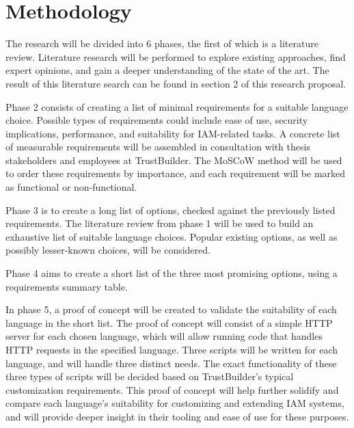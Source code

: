 
\section{Methodology}%
\label{sec:methodology}

The research will be divided into 6 phases, the first of which is a literature review. Literature research will be performed to explore existing approaches, find expert opinions, and gain a deeper understanding of the state of the art. The result of this literature search can be found in section 2 of this research proposal.

Phase 2 consists of creating a list of minimal requirements for a suitable language choice. Possible types of requirements could include ease of use, security implications, performance, and suitability for IAM-related tasks. A concrete list of measurable requirements will be assembled in consultation with thesis stakeholders and employees at TrustBuilder. The MoSCoW method will be used to order these requirements by importance, and each requirement will be marked as functional or non-functional.

Phase 3 is to create a long list of options, checked against the previously listed requirements. The literature review from phase 1 will be used to build an exhaustive list of suitable language choices. Popular existing options, as well as possibly lesser-known choices, will be considered.

Phase 4 aims to create a short list of the three most promising options, using a requirements summary table.

In phase 5, a proof of concept will be created to validate the suitability of each language in the short list. The proof of concept will consist of a simple HTTP server for each chosen language, which will allow running code that handles HTTP requests in the specified language. Three scripts will be written for each language, and will handle three distinct needs. The exact functionality of these three types of scripts will be decided based on TrustBuilder's typical customization requirements. This proof of concept will help further solidify and compare each language's suitability for customizing and extending IAM systems, and will provide deeper insight in their tooling and ease of use for these purposes.

